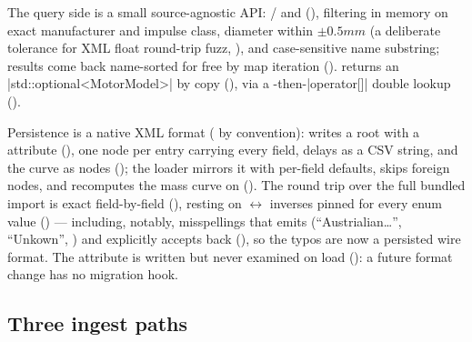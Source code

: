 The query side is a small source-agnostic API: / and
 (), filtering in memory on exact manufacturer
and impulse class, diameter within $\pm 0.5\unit{mm}$ (a deliberate tolerance for XML float
round-trip fuzz, ), and case-sensitive name substring;
results come back name-sorted for free by map iteration ().
 returns an \cppinline|std::optional<MotorModel>| by copy
(), via a -then-\cppinline|operator[]| double
lookup ().

Persistence is a native XML format ( by convention):  writes a
 root with a  attribute
(), one  node per entry carrying every
 field, delays as a CSV string, and the curve as  nodes
(); the loader mirrors it with per-field defaults, skips
foreign nodes, and recomputes the mass curve on 
(). The round trip over the full bundled import is exact
field-by-field (), resting on
$\leftrightarrow$ inverses pinned for every enum value
() --- including, notably, misspellings that
 emits (``Austrialian\ldots'', ``Unkown'', ) and
 explicitly accepts back (), so the typos are now a
persisted wire format. The  attribute is written but never examined on load
(): a future format change has no migration hook.

\subsection{Three ingest paths}\label{sec:motors-ingest}

